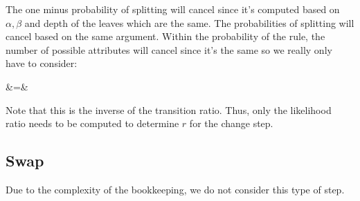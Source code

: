 The one minus probability of splitting will cancel since it's computed based on $\alpha, \beta$ and depth of the leaves which are the same. The probabilities of splitting will cancel based on the same argument. Within the probability of the rule, the number of possible attributes will cancel since it's the same so we really only have to consider:

\beqn
{} &=& \frac{\nrepstar}{\nrep} \frac{\nadj}{\nadjstar}
\eeqn

Note that this is the inverse of the transition ratio. Thus, only the likelihood ratio needs to be computed to determine $r$ for the change step.

\subsection*{Swap}

Due to the complexity of the bookkeeping, we do not consider this type of step.





